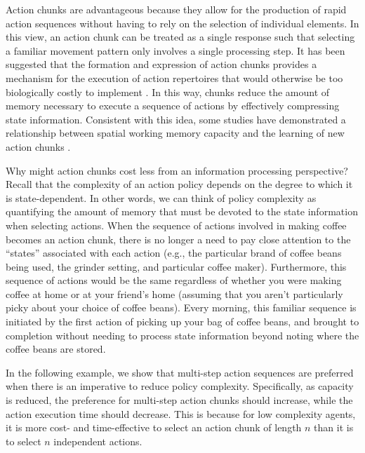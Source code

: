 \documentclass[11pt]{article}
\begin{document}
Action chunks are advantageous because they allow for the production of rapid action sequences without having to rely on the selection of individual elements. In this view, an action chunk can be treated as a single response such that selecting a familiar movement pattern only involves a single processing step. It has been suggested that the formation and expression of action chunks provides a mechanism for the execution of action repertoires that would otherwise be too biologically costly to implement \citep{graybiel98,ramkumar16}. In this way, chunks reduce the amount of memory necessary to execute a sequence of actions by effectively compressing state information. Consistent with this idea, some studies have demonstrated a relationship between spatial working memory capacity and the learning of new action chunks \citep{Bo2009-pa, Seidler2012-ab}.

Why might action chunks cost less from an information processing perspective? Recall that the complexity of an action policy depends on the degree to which it is state-dependent. In other words, we can think of policy complexity as quantifying the amount of memory that must be devoted to the state information when selecting actions. When the sequence of actions involved in making coffee becomes an action chunk, there is no longer a need to pay close attention to the ``states'' associated with each action (e.g., the particular brand of coffee beans being used, the grinder setting, and particular coffee maker). Furthermore, this sequence of actions would be the same regardless of whether you were making coffee at home or at your friend's home (assuming that you aren't particularly picky about your choice of coffee beans). Every morning, this familiar sequence is initiated by the first action of picking up your bag of coffee beans, and brought to completion without needing to process state information beyond noting where the coffee beans are stored.

In the following example, we show that multi-step action sequences are preferred when there is an imperative to reduce policy complexity. Specifically, as capacity is reduced, the preference for multi-step action chunks should increase, while the action execution time should decrease. This is because for low complexity agents, it is more cost- and time-effective to select an action chunk of length $n$ than it is to select $n$ independent actions.
\end{document}
